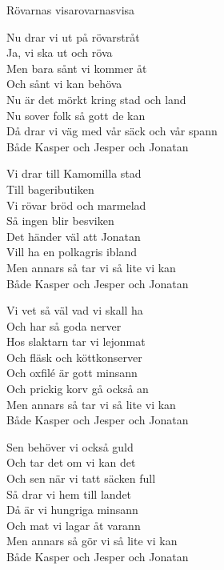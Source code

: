 \begin{song}{Rövarnas visa}{rovarnasvisa}
\begin{vers}
Nu drar vi ut på rövarstråt\\
Ja, vi ska ut och röva\\
Men bara sånt vi kommer åt\\
Och sånt vi kan behöva\\
Nu är det mörkt kring stad och land\\
Nu sover folk så gott de kan\\
Då drar vi väg med vår säck och vår spann\\
Både Kasper och Jesper och Jonatan\\
\end{vers}
\begin{vers}
Vi drar till Kamomilla stad\\
Till bageributiken\\
Vi rövar bröd och marmelad\\
Så ingen blir besviken\\
Det händer väl att Jonatan\\
Vill ha en polkagris ibland\\
Men annars så tar vi så lite vi kan\\
Både Kasper och Jesper och Jonatan\\
\end{vers}
\newp
\begin{vers}
Vi vet så väl vad vi skall ha\\
Och har så goda nerver\\
Hos slaktarn tar vi lejonmat\\
Och fläsk och köttkonserver\\
Och oxfilé är gott minsann\\
Och prickig korv gå också an\\
Men annars så tar vi så lite vi kan\\
Både Kasper och Jesper och Jonatan\\
\end{vers}
\begin{vers}
Sen behöver vi också guld\\
Och tar det om vi kan det\\
Och sen när vi tatt säcken full\\
Så drar vi hem till landet\\
Då är vi hungriga minsann\\
Och mat vi lagar åt varann\\
Men annars så gör vi så lite vi kan\\
Både Kasper och Jesper och Jonatan\\
\end{vers}
\end{song}
